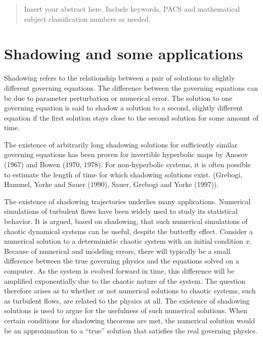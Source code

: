 \date{Received: date / Accepted: date}


\maketitle

\begin{abstract}
Insert your abstract here. Include keywords, PACS and mathematical
subject classification numbers as needed.
\end{abstract}

\maketitle
\section{Shadowing and some applications}

Shadowing refers to the relationship between a pair of solutions to slightly different governing equations. The difference between the governing equations can be due to parameter perturbation or numerical error. The solution to one governing equation is said to shadow a solution to a second, slightly different equation if
the first solution stays close to the second solution for some amount of time.

The existence of arbitrarily long shadowing solutions for sufficiently similar governing equations
has been proven for invertible hyperbolic maps by Anosov (1967) and Bowen (1970, 1978).
For non-hyperbolic systems, it is often possible to estimate the length of time for which shadowing
solutions exist. (Grebogi, Hammel, Yorke and Sauer (1990), Sauer, Grebogi and Yorke (1997)).

The existence of shadowing trajectories underlies many applications.
Numerical simulations of turbulent flows have been widely used to study its statistical behavior.
It is argued, based on shadowing, that such numerical simulations of chaotic dynamical systems can be
useful, despite the butterfly effect. Consider a numerical solution to a deterministic chaotic system with an initial condition $x$.
Because of numerical and modeling errors, there will typically be a small difference between the
true governing physics and the equations solved on a computer.  As the system is evolved forward
in time, this difference will be amplified exponentially due to the chaotic nature of the system.
The question therefore arises as to whether or not numerical solutions to chaotic systems, such
as turbulent flows, are related to the physics at all.  The existence of shadowing solutions
is used to argue for the usefulness of such numerical solutions.
When certain conditions for shadowing theorems are met, the numerical solution would be an
approximation to a ``true'' solution that satisfies the real governing physics.

